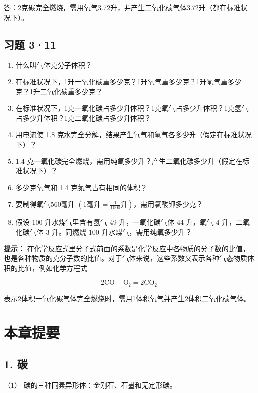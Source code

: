 答：2克碳完全燃烧，需用氧气3.72升，并产生二氧化碳气体3.72升（都在标准状况下）。

\subsection{习题 3·11}

\begin{enumerate}
\item
  什么叫气体克分子体积？
\item
  在标准状况下，1升一氧化碳重多少克？1升氧气重多少克？1升氢气重多少克？1升二氧化碳重多少克？
\item
  在标准状况下，1克一氧化碳占多少升体积？1克氧气占多少升体积？1克氢气占多少升体积？1克二氧化碳占多少升体积？
\item
  用电流使 1.8
  克水完全分解，结果产生氧气和氢气各多少升（假定在标准状况下）？
\item
  1.4
  克一氧化碳完全燃烧，需用纯氧多少升？产生二氧化碳多少升（假定在标准状况下）？
\item
  多少克氧气和 1.4 克氮气占有相同的体积？
\item
  要制得氧气560毫升
  \(\left(1\text{毫升}=\frac{1}{1000}\text{升}\right)\)，需用氯酸钾多少克？
\item
  假设 100 升水煤气里含有氢气 49 升，一氧化碳气体 44 升，氧气 4
  升，二氧化碳气体 3 升。同燃烧 100 升水煤气，需用纯氧多少升？
\end{enumerate}

\begin{shulihuadef}
\textbf{提示：}
在化学反应式里分子式前面的系数是化学反应中各物质的分子数的比值，也是各种物质的克分子数的比值。对于气体来说，这些系数又表示各种气态物质体积的比值，例如化学方程式
\end{shulihuadef}

\[
2 \mathrm{CO} + \mathrm{O}_{2} = 2 \mathrm{CO}_{2}
\]

表示2体积一氧化碳气体完全燃烧时，需用1体积氧气并产生2体积二氧化碳气体。

\section{本章提要}

\subsection{1. 碳}

（1） 碳的三种同素异形体：金刚石、石墨和无定形碳。

